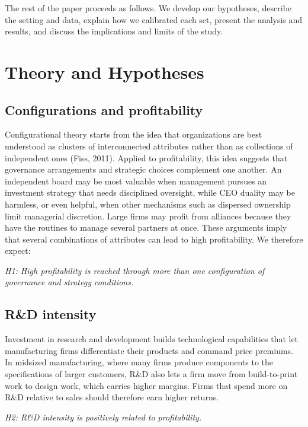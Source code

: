 \documentclass[11pt]{article}
\begin{document}
The rest of the paper proceeds as follows. We develop our hypotheses, describe the setting and data, explain how we calibrated each set, present the analysis and results, and discuss the implications and limits of the study.

\clearpage
\section{Theory and Hypotheses}

\subsection{Configurations and profitability}

Configurational theory starts from the idea that organizations are best understood as clusters of interconnected attributes rather than as collections of independent ones (Fiss, 2011). Applied to profitability, this idea suggests that governance arrangements and strategic choices complement one another. An independent board may be most valuable when management pursues an investment strategy that needs disciplined oversight, while CEO duality may be harmless, or even helpful, when other mechanisms such as dispersed ownership limit managerial discretion. Large firms may profit from alliances because they have the routines to manage several partners at once. These arguments imply that several combinations of attributes can lead to high profitability. We therefore expect:

\medskip
\noindent\emph{H1: High profitability is reached through more than one configuration of governance and strategy conditions.}
\medskip

\subsection{R\&D intensity}

Investment in research and development builds technological capabilities that let manufacturing firms differentiate their products and command price premiums. In midsized manufacturing, where many firms produce components to the specifications of larger customers, R\&D also lets a firm move from build-to-print work to design work, which carries higher margins. Firms that spend more on R\&D relative to sales should therefore earn higher returns.

\medskip
\noindent\emph{H2: R\&D intensity is positively related to profitability.}
\medskip
\end{document}
